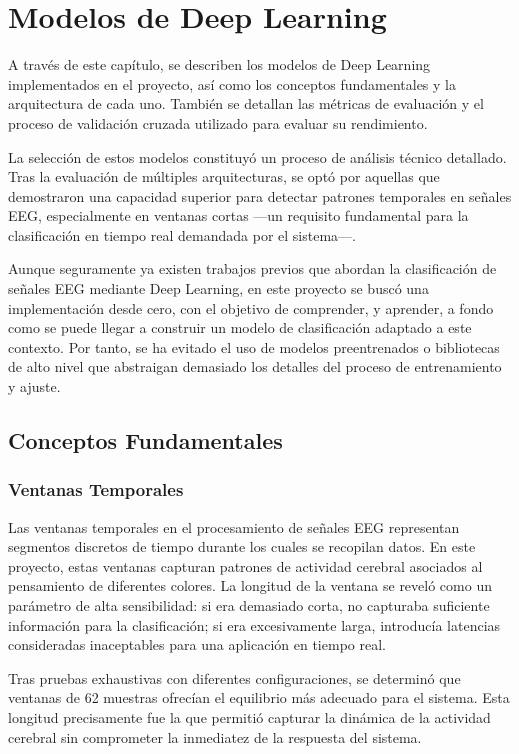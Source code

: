 \chapter{Modelos de Deep Learning}\label{ch:deep_learning_models}

A través de este capítulo, se describen los modelos de Deep Learning \cite{raschka2022machine} implementados en el proyecto, así como los conceptos fundamentales y la arquitectura de cada uno. También se detallan las métricas de evaluación y el proceso de validación cruzada utilizado para evaluar su rendimiento.

La selección de estos modelos constituyó un proceso de análisis técnico detallado. Tras la evaluación de múltiples arquitecturas, se optó por aquellas que demostraron una capacidad superior para detectar patrones temporales en señales EEG, especialmente en ventanas cortas —un requisito fundamental para la clasificación en tiempo real demandada por el sistema—.

Aunque seguramente ya existen trabajos previos que abordan la clasificación de señales EEG mediante Deep Learning, en este proyecto se buscó una implementación desde cero, con el objetivo de comprender, y aprender, a fondo como se puede llegar a construir un modelo de clasificación adaptado a este contexto. Por tanto, se ha evitado el uso de modelos preentrenados o bibliotecas de alto nivel que abstraigan demasiado los detalles del proceso de entrenamiento y ajuste.

\newpage
\section{Conceptos Fundamentales}

\subsection{Ventanas Temporales}
Las ventanas temporales en el procesamiento de señales EEG representan segmentos discretos de tiempo durante los cuales se recopilan datos. En este proyecto, estas ventanas capturan patrones de actividad cerebral asociados al pensamiento de diferentes colores. La longitud de la ventana se reveló como un parámetro de alta sensibilidad: si era demasiado corta, no capturaba suficiente información para la clasificación; si era excesivamente larga, introducía latencias consideradas inaceptables para una aplicación en tiempo real.

Tras pruebas exhaustivas con diferentes configuraciones, se determinó que ventanas de 62 muestras ofrecían el equilibrio más adecuado para el sistema. Esta longitud precisamente fue la que permitió capturar la dinámica de la actividad cerebral sin comprometer la inmediatez de la respuesta del sistema.


